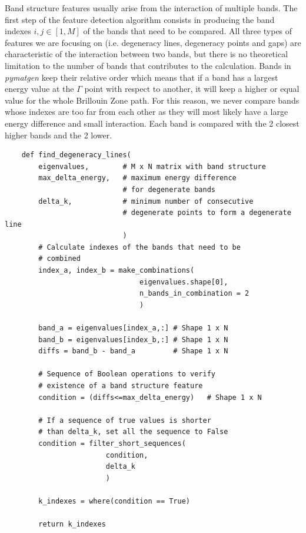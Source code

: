 \documentclass{article}
\begin{document}
Band structure features usually arise from the interaction of multiple bands. The first step of the feature detection algorithm consists in producing the band indexes $i,j \in [1,M]$ of the bands that need to be compared. All three types of features we are focusing on (i.e. degeneracy lines, degeneracy points and gaps) are characteristic of the interaction between two bands, but there is no theoretical limitation to the number of bands that contributes to the calculation. Bands in \textit{pymatgen} keep their relative order which means that if a band has a largest energy value at the $\Gamma$ point with respect to another, it will keep a higher or equal value for the whole Brillouin Zone path. For this reason, we never compare bands whose indexes are too far from each other as they will most likely have a large energy difference and small interaction. Each band is compared with the 2 closest higher bands and the 2 lower.

\begin{verbatim}
    def find_degeneracy_lines(
        eigenvalues,        # M x N matrix with band structure
        max_delta_energy,   # maximum energy difference
                            # for degenerate bands
        delta_k,            # minimum number of consecutive
                            # degenerate points to form a degenerate line
                            )
        # Calculate indexes of the bands that need to be
        # combined
        index_a, index_b = make_combinations(
                                eigenvalues.shape[0],
                                n_bands_in_combination = 2
                                )
                                
        band_a = eigenvalues[index_a,:] # Shape 1 x N
        band_b = eigenvalues[index_b,:] # Shape 1 x N
        diffs = band_b - band_a         # Shape 1 x N
        
        # Sequence of Boolean operations to verify
        # existence of a band structure feature
        condition = (diffs<=max_delta_energy)   # Shape 1 x N
        
        # If a sequence of true values is shorter
        # than delta_k, set all the sequence to False
        condition = filter_short_sequences(
                        condition,
                        delta_k
                        )
        
        k_indexes = where(condition == True)
        
        return k_indexes
        
\end{verbatim}
\end{document}
